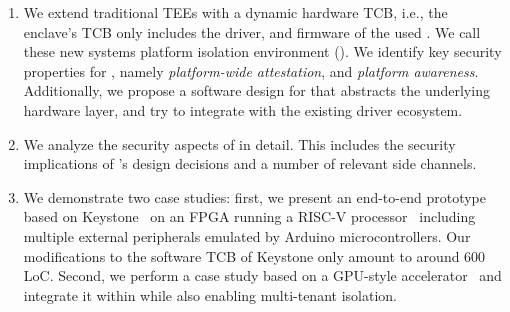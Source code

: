 \begin{enumerate}
  \item We extend traditional TEEs with a dynamic hardware TCB, i.e., the enclave's TCB only includes the driver, and firmware of the used \sphw. We call these new systems platform isolation environment (\name{}). We identify key security properties for \name{}, namely \emph{platform-wide attestation}, and \emph{platform awareness}. Additionally, we propose a software design for \name that abstracts the underlying hardware layer, and try to integrate with the existing driver ecosystem. 
  
  \item We analyze the security aspects of \name in detail. This includes the security implications of \name{}'s design decisions and a number of relevant side channels.
  
  \item We demonstrate two case studies: first, we present an end-to-end prototype based on Keystone~\cite{keystone} on an FPGA running a RISC-V processor~\cite{ariane} including multiple external peripherals emulated by Arduino microcontrollers. Our modifications to the software TCB of Keystone only amount to around 600 LoC. Second, we perform a case study based on a GPU-style accelerator~\cite{zaruba2020manticore} and integrate it within \name{} while also enabling multi-tenant isolation.

\end{enumerate}

